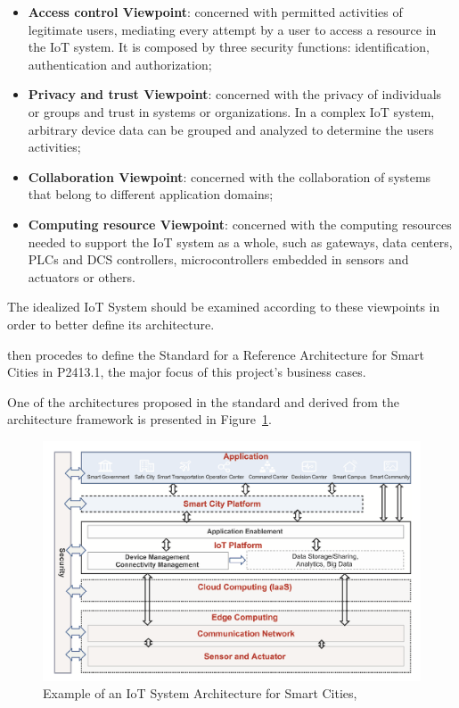\begin{itemize}
    \item \textbf{Access control Viewpoint}: concerned with permitted activities of legitimate users, mediating every attempt by a user to access a resource in the IoT system. It is composed by three security functions: identification, authentication and authorization;
    \item \textbf{Privacy and trust Viewpoint}: concerned with the privacy of individuals or groups and trust in systems or organizations. In a complex \gls{IoT} system, arbitrary device data can be grouped and analyzed to determine the users activities;
    \item \textbf{Collaboration Viewpoint}: concerned with the collaboration of systems that belong to different application domains;
    \item \textbf{Computing resource Viewpoint}: concerned with the computing resources needed to support the \gls{IoT} system as a whole, such as gateways, data centers, \gls{PLC}s and \gls{DCS} controllers, microcontrollers embedded in sensors and actuators or others.
\end{itemize}

The idealized \gls{IoT} System should be examined according to these viewpoints in order to better define its architecture.

\cite{9032420} then procedes to define the Standard for a Reference Architecture for Smart Cities in P2413.1, the major focus of this project's business cases.

One of the architectures proposed in the standard and derived from the architecture framework is presented in Figure~\ref{fig:stateofart:arch:p2413:rasc}. 

\begin{figure}[H]
    \centering
    \includegraphics[scale=0.4]{
        assets/figures/smart-city-p2413.png
    }
    \caption[Example of an \gls{IoT} System Architecture for Smart Cities]{Example of an \gls{IoT} System Architecture for Smart Cities, \cite{9032420}}
    \label{fig:stateofart:arch:p2413:rasc}
\end{figure}

